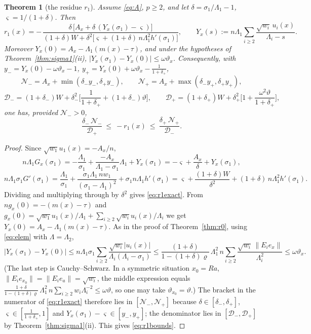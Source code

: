 \documentclass[11pt,a4paper]{article}
\theoremstyle{plain}
\newtheorem{theorem}{Theorem}[section]
\theoremstyle{definition}
\numberwithin{equation}{section}
\begin{document}
\begin{theorem}[the residue $r_1$]\label{thm:r1size}
Assume \eqref{eq:A}, $p\ge2$, and let $\delta=\sigma_1/\Lambda_1-1$, $\varsigma=1/(1+\delta)$. Then
\begin{equation}\label{eq:r1exact}
r_1(x)=-\,\frac{\delta\,\big[A_x+\delta\,(Y_x(\sigma_1)-\varsigma)\big]}{(1+\delta)W+\delta^2\big[\varsigma+(1+\delta)\,n\Lambda_1^2h'(\sigma_1)\big]},
\qquad Y_x(s):=n\Lambda_1\sum_{i\ge2}\frac{\sqrt{w_i}\,u_i(x)}{\Lambda_i-s}.
\end{equation}
Moreover $Y_x(0)=A_x-\Lambda_1(m(x)-\tau)$, and under the hypotheses of Theorem~\ref{thm:sigma1}(ii), $|Y_x(\sigma_1)-Y_x(0)|\le\omega\vartheta_x$. Consequently, with
$y_-=Y_x(0)-\omega\vartheta_x-1$, $y_+=Y_x(0)+\omega\vartheta_x-\frac1{1+\delta_+}$,
\[
\mathcal N_-=A_x+\min(\delta_-y_-,\delta_+y_-),\qquad \mathcal N_+=A_x+\max(\delta_-y_+,\delta_+y_+),
\]
\[
\mathcal D_-=(1+\delta_-)W+\delta_-^2\Big[\frac1{1+\delta_+}+(1+\delta_-)\vartheta\Big],\qquad
\mathcal D_+=(1+\delta_+)W+\delta_+^2\Big[1+\frac{\omega^2\vartheta}{1+\delta_+}\Big],
\]
one has, provided $\mathcal N_->0$,
\begin{equation}\label{eq:r1bounds}
\frac{\delta_-\,\mathcal N_-}{\mathcal D_+}\ \le\ -r_1(x)\ \le\ \frac{\delta_+\,\mathcal N_+}{\mathcal D_-} .
\end{equation}
\end{theorem}
\begin{proof}
Since $\sqrt{w_1}u_1(x)=-A_x/n$,
\[
n\Lambda_1G_x(\sigma_1)=-\frac{\Lambda_1}{\sigma_1}+\frac{-A_x}{\Lambda_1-\sigma_1}\Lambda_1+Y_x(\sigma_1)=-\varsigma+\frac{A_x}{\delta}+Y_x(\sigma_1),
\]
\[
n\Lambda_1\sigma_1G'(\sigma_1)=\frac{\Lambda_1}{\sigma_1}+\frac{\sigma_1\Lambda_1\,nw_1}{(\sigma_1-\Lambda_1)^2}+\sigma_1n\Lambda_1h'(\sigma_1)=\varsigma+\frac{(1+\delta)W}{\delta^2}+(1+\delta)\,n\Lambda_1^2h'(\sigma_1).
\]
Dividing and multiplying through by $\delta^2$ gives \eqref{eq:r1exact}. From $n g_x(0)=-(m(x)-\tau)$ and $g_x(0)=\sqrt{w_1}u_1(x)/\Lambda_1+\sum_{i\ge2}\sqrt{w_i}u_i(x)/\Lambda_i$ we get $Y_x(0)=A_x-\Lambda_1(m(x)-\tau)$. As in the proof of Theorem~\ref{thm:r0}, using \eqref{eq:elem} with $\Lambda=\Lambda_2$,
\[
|Y_x(\sigma_1)-Y_x(0)|\le n\Lambda_1\sigma_1\sum_{i\ge2}\frac{\sqrt{w_i}|u_i(x)|}{\Lambda_i(\Lambda_i-\sigma_1)}\le\frac{(1+\delta)}{1-(1+\delta)\varrho}\,\Lambda_1^2\,n\sum_{i\ge2}\frac{\sqrt{w_i}\,\|E_ie_x\|}{\Lambda_i^2}\le\omega\vartheta_x .
\]
(The last step is Cauchy--Schwarz. In a symmetric situation $x_0=Ra$, $\|E_ie_{x_0}\|=\|E_ie_a\|=\sqrt{w_i}$, the middle expression equals $\frac{1+\delta}{1-(1+\delta)\varrho}\,\Lambda_1^2\,n\sum_{i\ge2}w_i\Lambda_i^{-2}\le\omega\vartheta$, so one may take $\vartheta_{x_0}=\vartheta$.) The bracket in the numerator of \eqref{eq:r1exact} therefore lies in $[\mathcal N_-,\mathcal N_+]$ because $\delta\in[\delta_-,\delta_+]$, $\varsigma\in[\frac1{1+\delta_+},1]$ and $Y_x(\sigma_1)-\varsigma\in[y_-,y_+]$; the denominator lies in $[\mathcal D_-,\mathcal D_+]$ by Theorem~\ref{thm:sigma1}(ii). This gives \eqref{eq:r1bounds}.
\end{proof}
\end{document}
